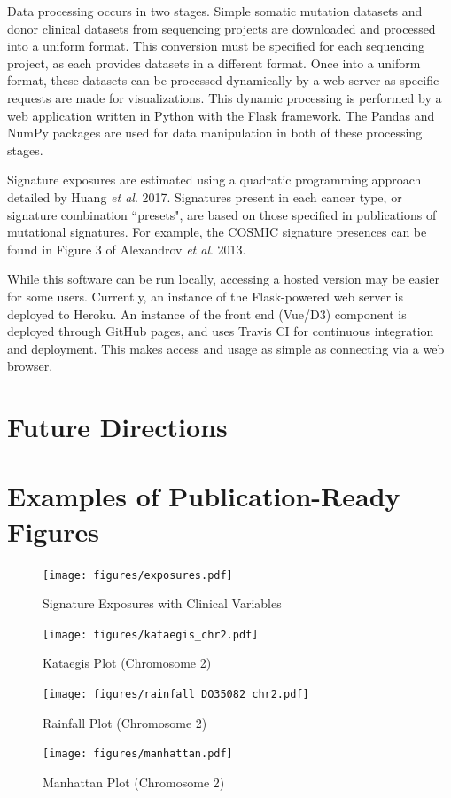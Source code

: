 \documentclass[12pt, letterpaper]{article}
\begin{document}
Data processing occurs in two stages. 
Simple somatic mutation datasets and donor clinical datasets from sequencing projects are downloaded and processed into a uniform format. 
This conversion must be specified for each sequencing project, as each provides datasets in a different format.
Once into a uniform format, these datasets can be processed dynamically by a web server as specific requests are made for visualizations.
This dynamic processing is performed by a web application written in Python with the Flask framework. 
The Pandas and NumPy packages are used for data manipulation in both of these processing stages.

Signature exposures are estimated using a quadratic programming approach detailed by Huang \textit{et al}. 2017\cite{huang2017detecting}.
Signatures present in each cancer type, or signature combination ``presets", are based on those specified in publications of mutational signatures.
For example, the COSMIC signature presences can be found in Figure 3 of Alexandrov \textit{et al}. 2013\cite{alexandrov2013signatures}.

While this software can be run locally, accessing a hosted version may be easier for some users.
Currently, an instance of the Flask-powered web server is deployed to Heroku.
An instance of the front end (Vue/D3) component is deployed through GitHub pages, and uses Travis CI for continuous integration and deployment.
This makes access and usage as simple as connecting via a web browser.

\section{Future Directions}


{}


\pagebreak
\appendix                                     
\section{Examples of Publication-Ready Figures}
\renewcommand{\figurename}{Example Figure}
\setcounter{figure}{0}

\begin{figure}[h!]
    \caption{Signature Exposures with Clinical Variables}
    \centering
    \texttt{[image: figures/exposures.pdf]}
\end{figure}
\begin{figure}[h!]
    \caption{Kataegis Plot (Chromosome 2)}
    \centering
    \texttt{[image: figures/kataegis\_chr2.pdf]}
\end{figure}
\begin{figure}[h!]
    \caption{Rainfall Plot (Chromosome 2)}
    \centering
    \texttt{[image: figures/rainfall\_DO35082\_chr2.pdf]}
\end{figure}
\begin{figure}[h!]
    \caption{Manhattan Plot (Chromosome 2)}
    \centering
    \texttt{[image: figures/manhattan.pdf]}
\end{figure}
\end{document}
